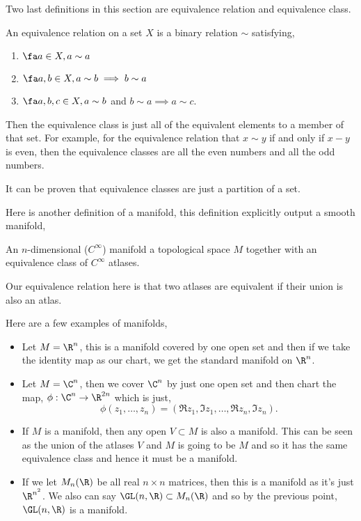 \noindent
Two last definitions in this section are equivalence relation and equivalence class.
\begin{ndefi}
  An equivalence relation on a set $X$ is a binary relation $\sim$ satisfying,
  \begin{enumerate}
    \item $\fa a \in X, a \sim a$
    \item $\fa a, b \in X, a \sim b \implies b \sim a$
    \item $\fa a, b, c \in X, a \sim b$ and $b \sim a \implies a \sim c$.
  \end{enumerate}
\end{ndefi}

\noindent
Then the equivalence class is just all of the equivalent elements to a member of that set. For example, for the equivalence relation that $x \sim y$ if and only if $x - y$ is even, then the equivalence classes are all the even numbers and all the odd numbers.

\begin{remark}
   It can be proven that equivalence classes are just a partition of a set. \cite{Buzzard-2020}
\end{remark}

\noindent
Here is another definition of a manifold, this definition explicitly output a smooth manifold,
\begin{ndefi}
  An $n$-dimensional ($C^\infty$) manifold a topological space $M$ together with an equivalence class of $C^\infty$ atlases.
\end{ndefi}
\begin{remark}
   Our equivalence relation here is that two atlases are equivalent if their union is also an atlas.
\end{remark}

\noindent
Here are a few examples of manifolds,
\begin{itemize}
  \item Let $M = \R^n$, this is a manifold covered by one open set and then if we take the identity map as our chart, we get the standard manifold on $\R^n$.
  \item Let $M = \C^n$, then we cover $\C^n$ by just one open set and then chart the map, $\phi : \C^n \to \R^{2n}$ which is  just,
  $$ \phi (z_1, \dots, z_n) = (\Re z_1, \Im z_1, \dots, \Re z_n, \Im z_n). $$
  \item If $M$ is a manifold, then any open $V \subset M$ is also a manifold. This can be seen as the union of the atlases $V$ and $M$ is going to be $M$ and so it has the same equivalence class and hence it must be a manifold.
  \item If we let $M_n (\R)$ be all real $n \times n$ matrices, then this is a manifold as it's just $\R^{n^2}$. We also can say $\GL(n, \R) \subset M_n(\R)$ and so by the previous point, $\GL(n, \R)$ is a manifold.
\end{itemize}


